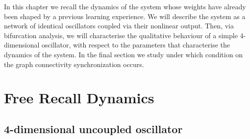 In this chapter we recall the dynamics of the system whose weights have already been shaped by a previous learning experience. We will describe the system as a network of identical oscillators coupled via their nonlinear output. Then, via bifurcation analysis, we will characterise the qualitative behaviour of a simple 4-dimensional oscillator, with respect to the parameters that characterise the dynamics of the system. In the final section we study under which condition on the graph connectivity synchronization occurs.

\section{Free Recall Dynamics}

\iffalse
\subsection{2by2 system without adaptation}

\fi
\subsection{4-dimensional uncoupled oscillator}
%
